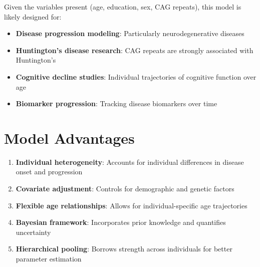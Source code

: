 \documentclass[12pt]{article}
\begin{document}
Given the variables present (age, education, sex, CAG repeats), this model is likely designed for:

\begin{itemize}[leftmargin=*]
    \item \textbf{Disease progression modeling}: Particularly neurodegenerative diseases
    \item \textbf{Huntington's disease research}: CAG repeats are strongly associated with Huntington's
    \item \textbf{Cognitive decline studies}: Individual trajectories of cognitive function over age
    \item \textbf{Biomarker progression}: Tracking disease biomarkers over time
\end{itemize}

\section{Model Advantages}

\begin{enumerate}[leftmargin=*]
    \item \textbf{Individual heterogeneity}: Accounts for individual differences in disease onset and progression
    \item \textbf{Covariate adjustment}: Controls for demographic and genetic factors
    \item \textbf{Flexible age relationships}: Allows for individual-specific age trajectories
    \item \textbf{Bayesian framework}: Incorporates prior knowledge and quantifies uncertainty
    \item \textbf{Hierarchical pooling}: Borrows strength across individuals for better parameter estimation
\end{enumerate}
\end{document}

